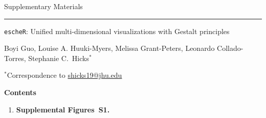 \documentclass[10pt,twocolumn]{article}
\begin{document}

\printbibliography



\clearpage
\onecolumn

{\huge Supplementary Materials}

\hrule

\vspace*{0.5cm}

\begin{center}

{\Large \texttt{escheR}: Unified multi-dimensional visualizations with Gestalt principles}

\vspace*{0.75cm}

{\large Boyi Guo, Louise A. Huuki-Myers, Melissa Grant-Peters, Leonardo Collado-Torres, Stephanie C.\ Hicks$^*$}

\vspace*{0.3cm}

{\small $^*$Correspondence to \url{shicks19@jhu.edu}}

\end{center}

\renewcommand{\figurename}{Supplementary Figure}
\renewcommand{\tablename}{Supplementary Table}
\setcounter{figure}{0}
\setcounter{table}{0}
\setcounter{section}{0}
\setcounter{page}{1}
\makeatletter
\renewcommand{\thefigure}{S\@arabic\c@figure}
\renewcommand{\thetable}{S\@arabic\c@table}
\renewcommand{\thesection}{Supplemental Note S\@arabic\c@section}
\makeatother

\vspace*{1cm}

{\bf \large Contents}

\begin{enumerate}
    \item \textbf{Supplemental Figures~S1.}
\end{enumerate}

\clearpage 

\end{document}
